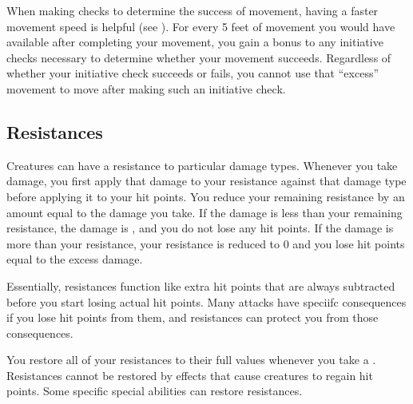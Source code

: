         \label{Movement-Based Initiative}
        When making  checks to determine the success of movement, having a faster movement speed is helpful (see ).
        For every 5 feet of movement you would have available after completing your movement, you gain a  bonus to any initiative checks necessary to determine whether your movement succeeds.
        Regardless of whether your initiative check succeeds or fails, you cannot use that ``excess'' movement to move after making such an initiative check.

    \subsection{Resistances}\label{Resistances}
        Creatures can have a resistance to particular damage types.
        Whenever you take damage, you first apply that damage to your resistance against that damage type before applying it to your hit points.
        You reduce your remaining resistance by an amount equal to the damage you take.
        If the damage is less than your remaining resistance, the damage is , and you do not lose any hit points.
        If the damage is more than your resistance, your resistance is reduced to 0 and you lose hit points equal to the excess damage.

        Essentially, resistances function like extra hit points that are always subtracted before you start losing actual hit points.
        Many attacks have speciifc consequences if you lose hit points from them, and resistances can protect you from those consequences.

        You restore all of your resistances to their full values whenever you take a .
        Resistances cannot be restored by effects that cause creatures to regain hit points.
        Some specific special abilities can restore resistances.

